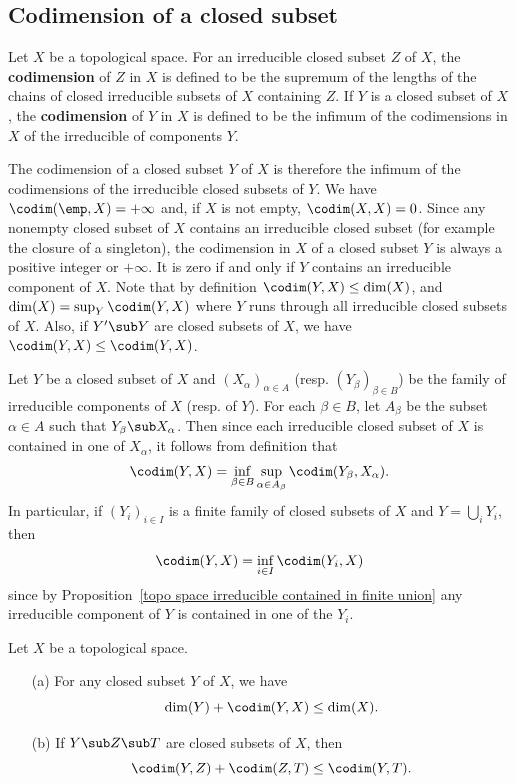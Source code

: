 \subsection{Codimension of a closed subset}
Let $X$ be a topological space. For an irreducible closed subset $Z$ of $X$, the \textbf{codimension} of $Z$ in $X$ is defined to be the supremum of the lengths of the chains of closed irreducible subsets of $X$ containing $Z$. If $Y$ is a closed subset of $X$, the \textbf{codimension} of $Y$ in $X$ is defined to be the infimum of the codimensions in $X$ of the irreducible of components $Y$.\par
The codimension of a closed subset $Y$ of $X$ is therefore the infimum of the codimensions of the irreducible closed subsets of $Y$. We have $\codim(\emp,X)=+\infty$ and, if $X$ is not empty, $\codim(X,X)=0$. Since any nonempty closed subset of $X$ contains an irreducible closed subset (for example the closure of a singleton), the codimension in $X$ of a closed subset $Y$ is always a positive integer or $+\infty$. It is zero if and only if $Y$ contains an irreducible component of $X$. Note that by definition $\codim(Y,X)\leq\dim(X)$, and $\dim(X)=\sup_Y\codim(Y,X)$ where $Y$ runs through all irreducible closed subsets of $X$. Also, if $Y'\sub Y$ are closed subsets of $X$, we have $\codim(Y,X)\leq\codim(Y,X)$.\par
Let $Y$ be a closed subset of $X$ and $(X_\alpha)_{\alpha\in A}$ (resp. $(Y_\beta)_{\beta\in B}$) be the family of irreducible components of $X$ (resp. of $Y$). For each $\beta\in B$, let $A_\beta$ be the subset $\alpha\in A$ such that $Y_\beta\sub X_\alpha$. Then since each irreducible closed subset of $X$ is contained in one of $X_\alpha$, it follows from definition that
\[\codim(Y,X)=\inf_{\beta\in B}\sup_{\alpha\in A_\beta}\codim(Y_\beta,X_\alpha).\]
In particular, if $(Y_i)_{i\in I}$ is a finite family of closed subsets of $X$ and $Y=\bigcup_iY_i$, then
\[\codim(Y,X)=\inf_{i\in I}\codim(Y_i,X)\]
since by Proposition~\ref{topo space irreducible contained in finite union} any irreducible component of $Y$ is contained in one of the $Y_i$.
\begin{proposition}\label{topo space codim prop}
Let $X$ be a topological space.
\begin{itemize}
\item[(a)] For any closed subset $Y$ of $X$, we have
\[\dim(Y)+\codim(Y,X)\leq\dim(X).\]  
\item[(b)] If $Y\sub Z\sub T$ are closed subsets of $X$, then
\[\codim(Y,Z)+\codim(Z,T)\leq\codim(Y,T).\] 
\end{itemize}
\end{proposition}
